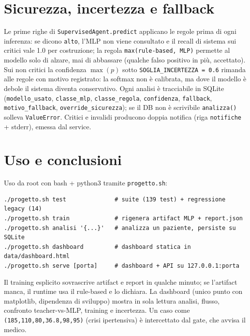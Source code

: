 \documentclass[11pt,a4paper]{article}
\newcommand{\codice}[1]{\texttt{#1}}
\newcommand{\file}[1]{\texttt{#1}}
\begin{document}
\section{Sicurezza, incertezza e fallback}\label{sec:sicurezza}

Le prime righe di \codice{SupervisedAgent.predict} applicano le regole prima
di ogni inferenza: se dicono \codice{alto}, l'MLP non viene consultato e il
recall di sistema sui critici vale 1.0 per costruzione; la regola
\codice{max(rule-based, MLP)} permette al modello solo di alzare, mai di
abbassare (qualche falso positivo in più, accettato). Sui non critici la
confidenza $\max(p)$ sotto \codice{SOGLIA\_INCERTEZZA = 0.6} rimanda alle
regole con motivo registrato: la softmax non è calibrata, ma dove il modello
è debole il sistema diventa conservativo. Ogni analisi è tracciabile in
SQLite (\codice{modello\_usato}, \codice{classe\_mlp},
\codice{classe\_regola}, \codice{confidenza}, \codice{fallback},
\codice{motivo\_fallback}, \codice{override\_sicurezza}); se il DB non è
scrivibile \codice{analizza()} solleva \codice{ValueError}. Critici e invalidi
producono doppia notifica (riga \codice{notifiche} + stderr), emessa dal
service.

\section{Uso e conclusioni}\label{sec:uso}

Uso da root con bash + python3 tramite \file{progetto.sh}:

\begin{lstlisting}[caption={Comandi principali di \file{progetto.sh}.}]
./progetto.sh test              # suite (139 test) + regressione legacy (14)
./progetto.sh train             # rigenera artifact MLP + report.json
./progetto.sh analisi '{...}'   # analizza un paziente, persiste su SQLite
./progetto.sh dashboard         # dashboard statica in data/dashboard.html
./progetto.sh serve [porta]     # dashboard + API su 127.0.0.1:porta
\end{lstlisting}
Il training esplicito sovrascrive artifact e report in qualche minuto; se
l'artifact manca, il runtime usa il rule-based e lo dichiara. La dashboard
(unico punto con matplotlib, dipendenza di sviluppo) mostra in sola lettura
analisi, flusso, confronto teacher-vs-MLP, training e incertezza. Un caso come
\codice{(185,110,80,36.8,98,95)} (crisi ipertensiva) è intercettato dal gate,
che avvisa il medico.
\end{document}
